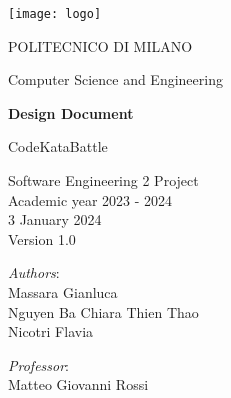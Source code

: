 \begin{titlingpage}
	\begin{center}
		\texttt{[image: logo]}
		
		\vspace{0.25cm}
		
		\LARGE POLITECNICO DI MILANO\\
		
		\vspace{0.2cm}
		
		\Large Computer Science and Engineering
		
		\vspace{0.8cm}
	
		\Huge \textbf{Design Document}
		
		\vspace{0.5cm}
		\huge CodeKataBattle
		
		\vspace{1.5cm}
		\LARGE Software Engineering 2 Project\\
		\Large Academic year 2023 - 2024\\
		\vspace{1cm}
		3 January 2024\\Version 1.0
		\vspace{2.5cm}
		
		\large
		\begin{minipage}{.1\textwidth}
			\null
		\end{minipage}%
		\begin{minipage}{.4\textwidth}
			\textit{Authors}:\\
			Massara Gianluca\\
			Nguyen Ba Chiara Thien Thao\\
			Nicotri Flavia
		\end{minipage}%
		\begin{minipage}{.4\textwidth}
			\raggedleft	
			\textit{Professor}:\\
			Matteo Giovanni Rossi\\
			\phantom{placeholder}
		\end{minipage}%
		\begin{minipage}{.1\textwidth}
			\null
		\end{minipage}
	
			
		\end{center}
\end{titlingpage}